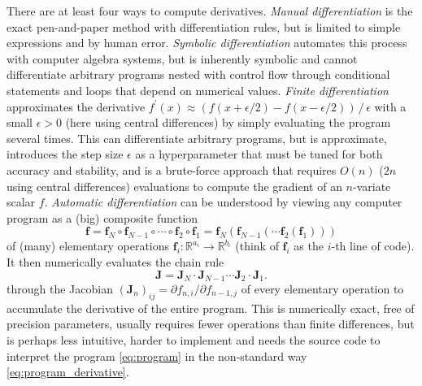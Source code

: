 \documentclass{aa}
\begin{document}
There are at least four ways to compute derivatives.
\textit{Manual differentiation} is the exact pen-and-paper method with differentiation rules, but is limited to simple expressions and by human error.
\textit{Symbolic differentiation} automates this process with computer algebra systems,
but is inherently symbolic and cannot differentiate arbitrary programs nested with control flow through conditional statements and loops that depend on numerical values.
\textit{Finite differentiation} approximates the derivative $f^\prime(x) \approx (f(x+\epsilon/2) - f(x-\epsilon/2)) \,/\, \epsilon$ with a small $\epsilon > 0$ (here using central differences) by simply evaluating the program several times.
This can differentiate arbitrary programs, but is approximate, introduces the step size $\epsilon$ as a hyperparameter that must be tuned for both accuracy and stability, and is a brute-force approach that requires $O(n)$ ($2n$ using central differences) evaluations to compute the gradient of an $n$-variate scalar $f$.
\textit{Automatic differentiation} \citep[e.g.][]{griewankEvaluatingDerivatives2008} can be understood by viewing any computer program as a (big) composite function
\begin{equation}
    \boldsymbol{f} = \boldsymbol{f}_N \circ \boldsymbol{f}_{N-1} \circ \cdots \circ \boldsymbol{f}_2 \circ \boldsymbol{f}_1 = \boldsymbol{f}_N(\boldsymbol{f}_{N-1}( \cdots \boldsymbol{f}_2(\boldsymbol{f}_1)))
\label{eq:program}
\end{equation}
of (many) elementary operations $\boldsymbol{f}_i: \mathbb{R}^{a_i} \rightarrow \mathbb{R}^{b_i}$ (think of $\boldsymbol{f}_i$ as the $i$-th line of code).
It then numerically evaluates the chain rule
\begin{equation}
    \boldsymbol{J} = \boldsymbol{J}_N \cdot \boldsymbol{J}_{N-1} \cdots \boldsymbol{J}_2 \cdot \boldsymbol{J}_1.
\label{eq:program_derivative}
\end{equation}
through the Jacobian $(\boldsymbol{J}_n)_{ij} = \partial f_{n,i} / \partial f_{n-1,j}$ of every elementary operation to accumulate the derivative of the entire program.
This is numerically exact, free of precision parameters, usually requires fewer operations than finite differences, but is perhaps less intuitive, harder to implement and needs the source code to interpret the program \eqref{eq:program} in the non-standard way \eqref{eq:program_derivative}.
\end{document}
